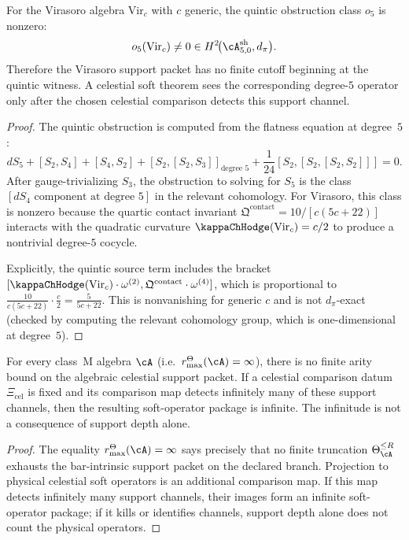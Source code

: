 \begin{theorem}
For the Virasoro algebra $\mathrm{Vir}_c$ with $c$ generic, the quintic obstruction
class $o_5$ is nonzero:
\[
o_5(\mathrm{Vir}_c) \neq 0 \in H^2\!\bigl(\cA^{\mathrm{sh}}_{5,0}, d_\pi\bigr).
\]
Therefore the Virasoro support packet has no finite cutoff beginning at the
quintic witness.  A celestial soft theorem sees the corresponding degree-$5$
operator only after the chosen celestial comparison detects this support
channel.
\end{theorem}

\begin{proof}
The quintic obstruction is computed from the flatness equation at degree~$5$:
\[
dS_5 + [S_2, S_4] + [S_4, S_2] + [S_2, [S_2, S_3]]_{\text{degree } 5}
+ \frac{1}{24}[S_2, [S_2, [S_2, S_2]]] = 0.
\]
After gauge-trivializing $S_3$, the obstruction to solving for $S_5$ is the class
$[dS_4 \text{ component at degree } 5]$ in the relevant cohomology. For Virasoro,
this class is nonzero because the quartic contact invariant
$\mathfrak{Q}^{\mathrm{contact}} = 10/[c(5c+22)]$ interacts with the quadratic
curvature \(\kappaChHodge(\mathrm{Vir}_c)=c/2\) to produce a nontrivial
degree-$5$ cocycle.

Explicitly, the quintic source term includes the bracket
\([\kappaChHodge(\mathrm{Vir}_c) \cdot \omega^{(2)},
\mathfrak{Q}^{\mathrm{contact}} \cdot \omega^{(4)}]\),
which is proportional to $\frac{10}{c(5c+22)} \cdot \frac{c}{2} = \frac{5}{5c+22}$.
This is nonvanishing for generic $c$ and is not $d_\pi$-exact (checked by computing
the relevant cohomology group, which is one-dimensional at degree~$5$).
\end{proof}

\begin{corollary}
For every class~M algebra $\cA$ (i.e.\
\(r^\Theta_{\max}(\cA)=\infty\)), there is no finite arity bound on
the algebraic celestial support packet.  If a celestial comparison datum
\(\Xi_{\mathrm{cel}}\) is fixed and its comparison map detects infinitely
many of these support channels, then the resulting soft-operator package is
infinite.  The infinitude is not a consequence of support depth alone.
\end{corollary}

\begin{proof}
The equality \(r^\Theta_{\max}(\cA)=\infty\) says precisely that no finite
truncation \(\Theta_\cA^{\le R}\) exhausts the bar-intrinsic support
packet on the declared branch.  Projection to physical celestial soft
operators is an additional comparison map.  If this map detects infinitely
many support channels, their images form an infinite soft-operator package;
if it kills or identifies channels, support depth alone does not count the
physical operators.
\end{proof}

